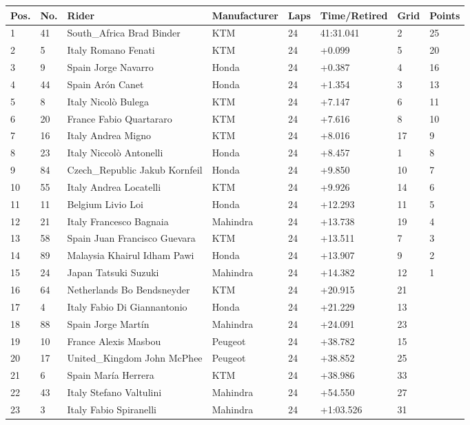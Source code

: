 \documentclass{article}
\begin{document}
\begin{tabular}{llllllll}
\toprule
Pos. & No. & Rider & Manufacturer & Laps & Time/Retired & Grid & Points \\
\midrule
1 & 41 & South\_Africa Brad Binder & KTM & 24 & 41:31.041 & 2 & 25 \\
2 & 5 & Italy Romano Fenati & KTM & 24 & +0.099 & 5 & 20 \\
3 & 9 & Spain Jorge Navarro & Honda & 24 & +0.387 & 4 & 16 \\
4 & 44 & Spain Arón Canet & Honda & 24 & +1.354 & 3 & 13 \\
5 & 8 & Italy Nicolò Bulega & KTM & 24 & +7.147 & 6 & 11 \\
6 & 20 & France Fabio Quartararo & KTM & 24 & +7.616 & 8 & 10 \\
7 & 16 & Italy Andrea Migno & KTM & 24 & +8.016 & 17 & 9 \\
8 & 23 & Italy Niccolò Antonelli & Honda & 24 & +8.457 & 1 & 8 \\
9 & 84 & Czech\_Republic Jakub Kornfeil & Honda & 24 & +9.850 & 10 & 7 \\
10 & 55 & Italy Andrea Locatelli & KTM & 24 & +9.926 & 14 & 6 \\
11 & 11 & Belgium Livio Loi & Honda & 24 & +12.293 & 11 & 5 \\
12 & 21 & Italy Francesco Bagnaia & Mahindra & 24 & +13.738 & 19 & 4 \\
13 & 58 & Spain Juan Francisco Guevara & KTM & 24 & +13.511 & 7 & 3 \\
14 & 89 & Malaysia Khairul Idham Pawi & Honda & 24 & +13.907 & 9 & 2 \\
15 & 24 & Japan Tatsuki Suzuki & Mahindra & 24 & +14.382 & 12 & 1 \\
16 & 64 & Netherlands Bo Bendsneyder & KTM & 24 & +20.915 & 21 &  \\
17 & 4 & Italy Fabio Di Giannantonio & Honda & 24 & +21.229 & 13 &  \\
18 & 88 & Spain Jorge Martín & Mahindra & 24 & +24.091 & 23 &  \\
19 & 10 & France Alexis Masbou & Peugeot & 24 & +38.782 & 15 &  \\
20 & 17 & United\_Kingdom John McPhee & Peugeot & 24 & +38.852 & 25 &  \\
21 & 6 & Spain María Herrera & KTM & 24 & +38.986 & 33 &  \\
22 & 43 & Italy Stefano Valtulini & Mahindra & 24 & +54.550 & 27 &  \\
23 & 3 & Italy Fabio Spiranelli & Mahindra & 24 & +1:03.526 & 31 &  \\

\end{tabular}
\end{document}
